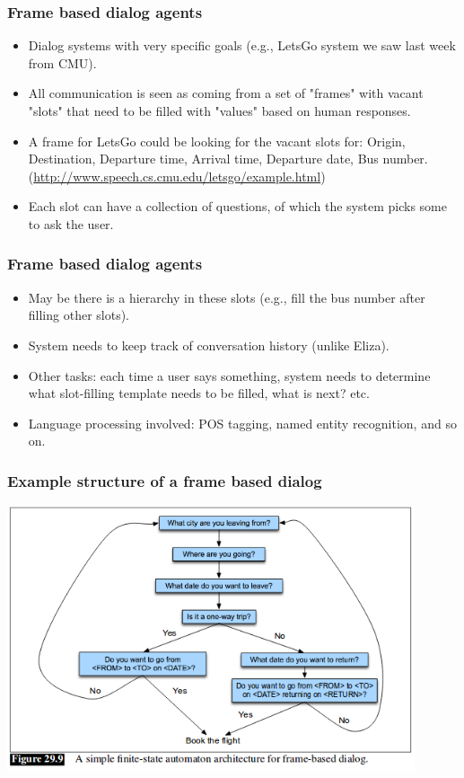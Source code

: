 \documentclass{beamer}
\begin{document}
\begin{frame}
\frametitle{Frame based dialog agents}
\begin{itemize}
\item Dialog systems with very specific goals (e.g., LetsGo system we saw last week from CMU).
\item All communication is seen as coming from a set of "frames" with vacant "slots" that need to be filled with "values" based on human responses. 
\item A frame for LetsGo could be looking for the vacant slots for: Origin, Destination, Departure time, Arrival time, Departure date, Bus number. (\url{http://www.speech.cs.cmu.edu/letsgo/example.html})
\item Each slot can have a collection of questions, of which the system picks some to ask the user. 
\end{itemize}
\end{frame}

\begin{frame}
\frametitle{Frame based dialog agents}
\begin{itemize}
\item May be there is a hierarchy in these slots (e.g., fill the bus number after filling other slots).
\item System needs to keep track of conversation history (unlike Eliza).
\item Other tasks: each time a user says something, system needs to determine what slot-filling template needs to be filled, what is next? etc. 
\item Language processing involved: POS tagging, named entity recognition, and so on. 
\end{itemize}
\end{frame}

\begin{frame}
\frametitle{Example structure of a frame based dialog }
\includegraphics[width=0.9\textwidth]{framedialog.png}
\end{frame}
\end{document}
